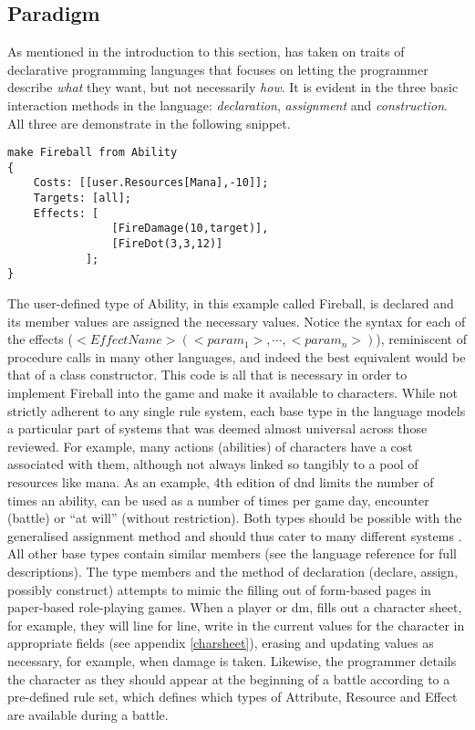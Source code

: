 \subsection{Paradigm}
\label{language:paradigm}
As mentioned in the introduction to this section, \langname{} has taken on traits of declarative programming languages that focuses on letting the programmer describe \emph{what} they want, but not necessarily \emph{how}. It is evident in the three basic interaction methods in the language: \emph{declaration}, \emph{assignment} and \emph{construction}. All three are demonstrate in the following snippet. 

\begin{lstlisting}[language=fflang]
make Fireball from Ability
{
	Costs: [[user.Resources[Mana],-10]];
	Targets: [all];
	Effects: [
				[FireDamage(10,target)],
				[FireDot(3,3,12)]
			];
}
\end{lstlisting}

The user-defined type of Ability, in this example called Fireball, is declared and its member values are assigned the necessary values. Notice the syntax for each of the effects ($<EffectName>(<param_1>, \cdots ,<param_n>)$), reminiscent of procedure calls in many other languages, and indeed the best equivalent would be that of a class constructor. This code is all that is necessary in order to implement Fireball into the game and make it available to characters.
While not strictly adherent to any single rule system, each base type in the language models a particular part of systems that was deemed almost universal across those reviewed. For example, many actions (abilities) of characters have a cost associated with them, although not always linked so tangibly to a pool of resources like mana.
As an example, 4th edition of \ac{dnd} limits the number of times an ability, can be used as a number of times per game day, encounter (battle) or ``at will'' (without restriction). Both types should be possible with the generalised assignment method and should thus cater to many different systems . All other base types contain similar members (see the language reference for full descriptions).
The type members and the method of declaration (declare, assign, possibly construct) attempts to mimic the filling out of form-based pages in paper-based role-playing games. When a player or \ac{dm}, fills out a character sheet, for example, they will line for line, write in the current values for the character in appropriate fields (see appendix \vref{charsheet}), erasing and updating values as necessary, for example, when damage is taken.
Likewise, the programmer details the character as they should appear at the beginning of a battle according to a pre-defined rule set, which defines which types of Attribute, Resource and Effect are available during a battle.

